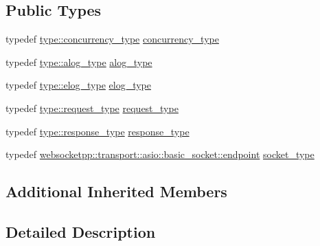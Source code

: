 \subsection*{Public Types}
\begin{DoxyCompactItemize}
\item 
typedef \hyperlink{structwebsocketpp_1_1config_1_1asio__client_a0443785a3a6e6f8d0f924fad4206b9a8}{type\+::concurrency\+\_\+type} \hyperlink{structwebsocketpp_1_1config_1_1asio__client_1_1transport__config_ad62de38314e78accadf00be8d4fbae67}{concurrency\+\_\+type}
\item 
typedef \hyperlink{structwebsocketpp_1_1config_1_1asio__client_af6deeb2d0492bb8680b4e030fd201185}{type\+::alog\+\_\+type} \hyperlink{structwebsocketpp_1_1config_1_1asio__client_1_1transport__config_a0294e35bd4a0110bfe59f6b0acb7c240}{alog\+\_\+type}
\item 
typedef \hyperlink{structwebsocketpp_1_1config_1_1asio__client_abbef282de8c085b57d8f6780f0187a1d}{type\+::elog\+\_\+type} \hyperlink{structwebsocketpp_1_1config_1_1asio__client_1_1transport__config_a9c944b91c2196a8ce6d37c82fc97ef6a}{elog\+\_\+type}
\item 
typedef \hyperlink{structwebsocketpp_1_1config_1_1asio__client_ab199fcea968ae7873e81b07bc4cfe0b8}{type\+::request\+\_\+type} \hyperlink{structwebsocketpp_1_1config_1_1asio__client_1_1transport__config_aebeda57b20f9cf83ff7edf1991ccbe25}{request\+\_\+type}
\item 
typedef \hyperlink{structwebsocketpp_1_1config_1_1asio__client_aa83f5f53ad2530fcf2af691a44ca74c0}{type\+::response\+\_\+type} \hyperlink{structwebsocketpp_1_1config_1_1asio__client_1_1transport__config_a059b73720e41d697f2a3731519f36e38}{response\+\_\+type}
\item 
typedef \hyperlink{classwebsocketpp_1_1transport_1_1asio_1_1basic__socket_1_1endpoint}{websocketpp\+::transport\+::asio\+::basic\+\_\+socket\+::endpoint} \hyperlink{structwebsocketpp_1_1config_1_1asio__client_1_1transport__config_abf6209c3fcb8d3705036441ca16e23c6}{socket\+\_\+type}
\end{DoxyCompactItemize}
\subsection*{Additional Inherited Members}


\subsection{Detailed Description}


